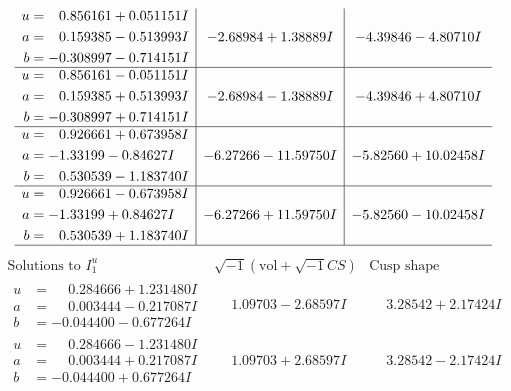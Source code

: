 \documentclass[1p]{elsarticle_modified}
\theoremstyle{definition}
\newcommand{\I}{\sqrt{-1}}
\begin{document}
$$\begin{array}{c|c|c}
\begin{aligned}
u &= \phantom{-}0.856161 + 0.051151 I \\
a &= \phantom{-}0.159385 - 0.513993 I \\
b &= -0.308997 - 0.714151 I\end{aligned}
 & -2.68984 + 1.38889 I & -4.39846 - 4.80710 I \\ \hline\begin{aligned}
u &= \phantom{-}0.856161 - 0.051151 I \\
a &= \phantom{-}0.159385 + 0.513993 I \\
b &= -0.308997 + 0.714151 I\end{aligned}
 & -2.68984 - 1.38889 I & -4.39846 + 4.80710 I \\ \hline\begin{aligned}
u &= \phantom{-}0.926661 + 0.673958 I \\
a &= -1.33199 - 0.84627 I \\
b &= \phantom{-}0.530539 - 1.183740 I\end{aligned}
 & -6.27266 - 11.59750 I & -5.82560 + 10.02458 I \\ \hline\begin{aligned}
u &= \phantom{-}0.926661 - 0.673958 I \\
a &= -1.33199 + 0.84627 I \\
b &= \phantom{-}0.530539 + 1.183740 I\end{aligned}
 & -6.27266 + 11.59750 I & -5.82560 - 10.02458 I\\
 \hline 
 \end{array}$$\newpage$$\begin{array}{c|c|c}  
\text{Solutions to }I^u_{1}& \I (\text{vol} + \sqrt{-1}CS) & \text{Cusp shape}\\
 \hline 
\begin{aligned}
u &= \phantom{-}0.284666 + 1.231480 I \\
a &= \phantom{-}0.003444 - 0.217087 I \\
b &= -0.044400 - 0.677264 I\end{aligned}
 & \phantom{-}1.09703 - 2.68597 I & \phantom{-}3.28542 + 2.17424 I \\ \hline\begin{aligned}
u &= \phantom{-}0.284666 - 1.231480 I \\
a &= \phantom{-}0.003444 + 0.217087 I \\
b &= -0.044400 + 0.677264 I\end{aligned}
 & \phantom{-}1.09703 + 2.68597 I & \phantom{-}3.28542 - 2.17424 I \\ \hline\begin{aligned}

\end{aligned}
\end{array}$$
\end{document}
